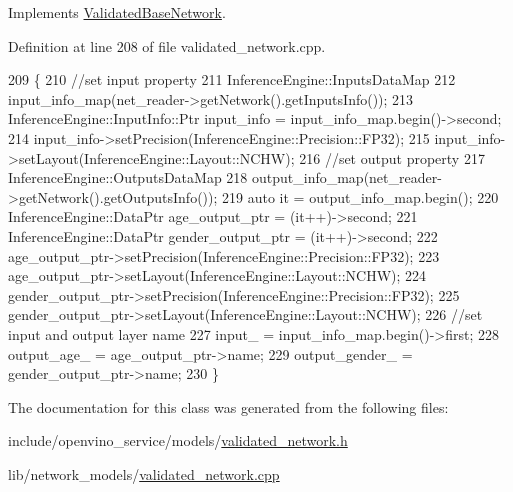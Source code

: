 Implements \hyperlink{classValidatedBaseNetwork_a3b43f5e3b004d75873a644d2132fbb58}{Validated\+Base\+Network}.



Definition at line 208 of file validated\+\_\+network.\+cpp.


\begin{DoxyCode}
209                                                \{
210   \textcolor{comment}{//set input property}
211   InferenceEngine::InputsDataMap
212       input\_info\_map(net\_reader->getNetwork().getInputsInfo());
213   InferenceEngine::InputInfo::Ptr input\_info = input\_info\_map.begin()->second;
214   input\_info->setPrecision(InferenceEngine::Precision::FP32);
215   input\_info->setLayout(InferenceEngine::Layout::NCHW);
216   \textcolor{comment}{//set output property}
217   InferenceEngine::OutputsDataMap
218       output\_info\_map(net\_reader->getNetwork().getOutputsInfo());
219   \textcolor{keyword}{auto} it = output\_info\_map.begin();
220   InferenceEngine::DataPtr age\_output\_ptr = (it++)->second;
221   InferenceEngine::DataPtr gender\_output\_ptr = (it++)->second;
222   age\_output\_ptr->setPrecision(InferenceEngine::Precision::FP32);
223   age\_output\_ptr->setLayout(InferenceEngine::Layout::NCHW);
224   gender\_output\_ptr->setPrecision(InferenceEngine::Precision::FP32);
225   gender\_output\_ptr->setLayout(InferenceEngine::Layout::NCHW);
226   \textcolor{comment}{//set input and output layer name}
227   input\_ = input\_info\_map.begin()->first;
228   output\_age\_ = age\_output\_ptr->name;
229   output\_gender\_ = gender\_output\_ptr->name;
230 \}
\end{DoxyCode}


The documentation for this class was generated from the following files\+:\begin{DoxyCompactItemize}
\item 
include/openvino\+\_\+service/models/\hyperlink{validated__network_8h}{validated\+\_\+network.\+h}\item 
lib/network\+\_\+models/\hyperlink{validated__network_8cpp}{validated\+\_\+network.\+cpp}\end{DoxyCompactItemize}
